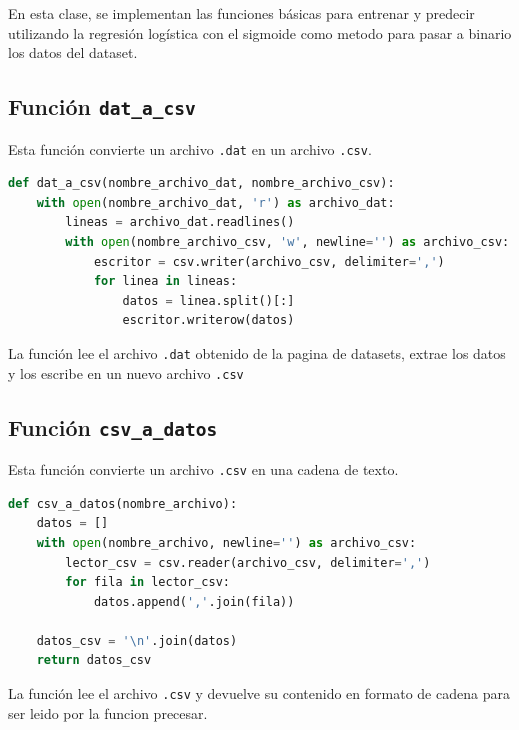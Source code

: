 \documentclass[12pt]{article}
\begin{document}
En esta clase, se implementan las funciones básicas para entrenar y predecir utilizando la regresión logística con el sigmoide como metodo para pasar a binario los datos del dataset.

\vspace{1cm}

\subsection*{Función \texttt{dat\_a\_csv}}
Esta función convierte un archivo \texttt{.dat} en un archivo \texttt{.csv}.
\vspace{1cm}

\begin{lstlisting}[language=Python]
def dat_a_csv(nombre_archivo_dat, nombre_archivo_csv):
    with open(nombre_archivo_dat, 'r') as archivo_dat:
        lineas = archivo_dat.readlines()
        with open(nombre_archivo_csv, 'w', newline='') as archivo_csv:
            escritor = csv.writer(archivo_csv, delimiter=',')
            for linea in lineas:
                datos = linea.split()[:]
                escritor.writerow(datos)
\end{lstlisting}
\vspace{1cm}

La función lee el archivo \texttt{.dat} obtenido de la pagina de datasets, extrae los datos y los escribe en un nuevo archivo \texttt{.csv}

\vspace{1cm}

\subsection*{Función \texttt{csv\_a\_datos}}
Esta función convierte un archivo \texttt{.csv} en una cadena de texto.
\vspace{1cm}

\begin{lstlisting}[language=Python]
def csv_a_datos(nombre_archivo):
    datos = []
    with open(nombre_archivo, newline='') as archivo_csv:
        lector_csv = csv.reader(archivo_csv, delimiter=',')
        for fila in lector_csv:
            datos.append(','.join(fila))

    datos_csv = '\n'.join(datos)
    return datos_csv
\end{lstlisting}
\vspace{1cm}

La función lee el archivo \texttt{.csv} y devuelve su contenido en formato de cadena para ser leido por la funcion precesar.
\end{document}

